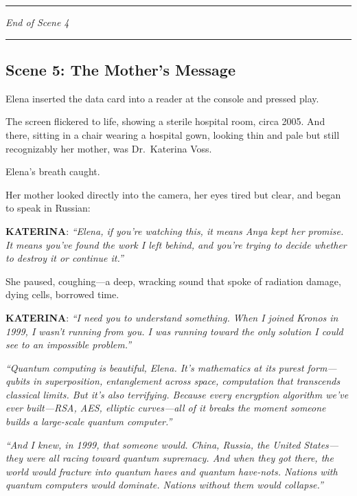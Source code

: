 \documentclass[12pt,letterpaper]{book}
\begin{document}
\begin{center}\rule{0.5\linewidth}{0.5pt}\end{center}

\emph{End of Scene 4}

\begin{center}\rule{0.5\linewidth}{0.5pt}\end{center}

\hypertarget{scene-5-the-mothers-message}{%
\subsection{Scene 5: The Mother's Message}\label{scene-5-the-mothers-message}}

Elena inserted the data card into a reader at the console and pressed play.

The screen flickered to life, showing a sterile hospital room, circa 2005. And there, sitting in a chair wearing a hospital gown, looking thin and pale but still recognizably her mother, was Dr.~Katerina Voss.

Elena's breath caught.

Her mother looked directly into the camera, her eyes tired but clear, and began to speak in Russian:

\textbf{KATERINA}: \emph{``Elena, if you're watching this, it means Anya kept her promise. It means you've found the work I left behind, and you're trying to decide whether to destroy it or continue it.''}

She paused, coughing---a deep, wracking sound that spoke of radiation damage, dying cells, borrowed time.

\textbf{KATERINA}: \emph{``I need you to understand something. When I joined Kronos in 1999, I wasn't running from you. I was running toward the only solution I could see to an impossible problem.''}

\emph{``Quantum computing is beautiful, Elena. It's mathematics at its purest form---qubits in superposition, entanglement across space, computation that transcends classical limits. But it's also terrifying. Because every encryption algorithm we've ever built---RSA, AES, elliptic curves---all of it breaks the moment someone builds a large-scale quantum computer.''}

\emph{``And I knew, in 1999, that someone would. China, Russia, the United States---they were all racing toward quantum supremacy. And when they got there, the world would fracture into quantum haves and quantum have-nots. Nations with quantum computers would dominate. Nations without them would collapse.''}
\end{document}
